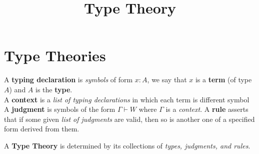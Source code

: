 


    \title{Type Theory}
    \author{{\color{pink}{Cloudi}}{\color{Aquamarine}{fold}}}
    \maketitle
    \newpage

    \setcounter{section}{-1}

    \section{Type Theories}

    \begin{defn}
        A \textbf{typing declaration} is \textit{symbols} of form $x : A$,
        we say that $x$ is a \textbf{term} (of type $A$) and $A$ is the \textbf{type}.\\
        A \textbf{context} is a \textit{list of typing declarations} in which each term is different symbol\\
        A \textbf{judgment} is symbols of the form $\Gamma \vdash W$ where $\Gamma$ is a \textit{context}.
        A \textbf{rule} asserts that if some given \textit{list of judgments} are valid,
        then so is another one of a specified form derived from them. 
    \end{defn}
    
    \begin{defn}
        A \textbf{Type Theory} is determined by its collections of \textit{types, judgments, and rules}.
    \end{defn}

    

    \vspace*{0.9cm}
    

